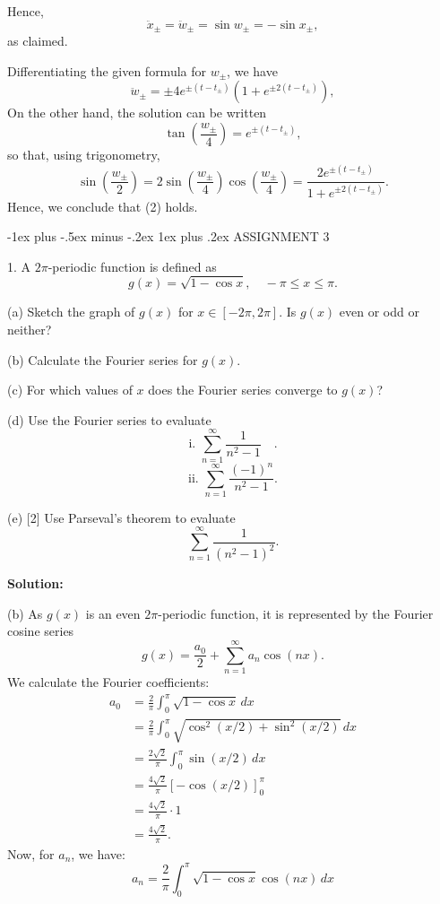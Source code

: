 \documentclass[10pt,landscape]{article}
\makeatletter
\renewcommand{\subsubsection}{\@startsection{subsubsection}{3}{0mm}%
                                {-1ex plus -.5ex minus -.2ex}%
                                {1ex plus .2ex}%
                                {\normalfont\small\bfseries}}
\makeatother
\begin{document}
\begin{multicols}{2}
Hence,\\
\[
\ddot{x}_{\pm} = \ddot{w}_{\pm} = \sin w_{\pm} = -\sin x_{\pm},
\]
as claimed. 

Differentiating the given formula for \( w_{\pm} \), we have\\
\[
\ddot{w}_{\pm} = \pm 4 e^{\pm(t - t_{\pm})} \left( 1 + e^{\pm 2(t - t_{\pm})} \right),
\]
On the other hand, the solution can be written\\
\[
\tan \left( \frac{w_{\pm}}{4} \right) = e^{\pm(t - t_{\pm})},
\]
so that, using trigonometry,\\
\[
\sin \left( \frac{w_{\pm}}{2} \right) = 2 \sin \left( \frac{w_{\pm}}{4} \right) \cos \left( \frac{w_{\pm}}{4} \right) = \frac{2 e^{\pm(t - t_{\pm})}}{1 + e^{\pm 2(t - t_{\pm})}}.
\]
Hence, we conclude that (2) holds.

\subsubsection{ASSIGNMENT 3}

1. A \( 2\pi \)-periodic function is defined as\\
\[
g(x) = \sqrt{1 - \cos x}, \quad -\pi \le x \le \pi.
\]

(a) Sketch the graph of \( g(x) \) for \( x \in [-2\pi, 2\pi] \). Is \( g(x) \) even or odd or neither?

(b) Calculate the Fourier series for \( g(x) \).

(c)  For which values of \( x \) does the Fourier series converge to \( g(x) \)?

(d) Use the Fourier series to evaluate\\
\[
\text{i. } \sum_{n=1}^{\infty} \frac{1}{n^2 - 1} \quad.
\]
\[
\text{ii. } \sum_{n=1}^{\infty} \frac{(-1)^n}{n^2 - 1}.\]

(e) [2] Use Parseval’s theorem to evaluate\\
\[
\sum_{n=1}^{\infty} \frac{1}{(n^2 - 1)^2}.
\]

\textbf{Solution:}

(b) As \( g(x) \) is an even \( 2\pi \)-periodic function, it is represented by the Fourier cosine series\\
\[
g(x) = \frac{a_0}{2} + \sum_{n=1}^{\infty} a_n \cos(nx).
\]
We calculate the Fourier coefficients:\\
\begin{align*}
a_0 &= \frac{2}{\pi} \int_0^\pi \sqrt{1 - \cos x} \, dx \\
    &= \frac{2}{\pi} \int_0^\pi \sqrt{\cos^2(x/2) + \sin^2(x/2)} \, dx \\
    &= \frac{2\sqrt{2}}{\pi} \int_0^\pi \sin(x/2) \, dx \\
    &= \frac{4\sqrt{2}}{\pi} \left[ -\cos(x/2) \right]_{0}^{\pi} \\
    &= \frac{4\sqrt{2}}{\pi} \cdot 1 \\
    &= \frac{4\sqrt{2}}{\pi}.
\end{align*}
Now, for \( a_n \), we have:\\
\[
a_n = \frac{2}{\pi} \int_0^\pi \sqrt{1 - \cos x} \cos(nx) \, dx
\]


\end{multicols}
\end{document}
